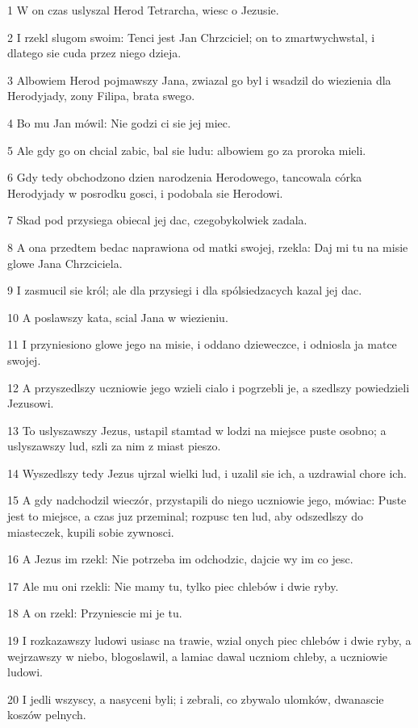 \par 1 W on czas uslyszal Herod Tetrarcha, wiesc o Jezusie.
\par 2 I rzekl slugom swoim: Tenci jest Jan Chrzciciel; on to zmartwychwstal, i dlatego sie cuda przez niego dzieja.
\par 3 Albowiem Herod pojmawszy Jana, zwiazal go byl i wsadzil do wiezienia dla Herodyjady, zony Filipa, brata swego.
\par 4 Bo mu Jan mówil: Nie godzi ci sie jej miec.
\par 5 Ale gdy go on chcial zabic, bal sie ludu: albowiem go za proroka mieli.
\par 6 Gdy tedy obchodzono dzien narodzenia Herodowego, tancowala córka Herodyjady w posrodku gosci, i podobala sie Herodowi.
\par 7 Skad pod przysiega obiecal jej dac, czegobykolwiek zadala.
\par 8 A ona przedtem bedac naprawiona od matki swojej, rzekla: Daj mi tu na misie glowe Jana Chrzciciela.
\par 9 I zasmucil sie król; ale dla przysiegi i dla spólsiedzacych kazal jej dac.
\par 10 A poslawszy kata, scial Jana w wiezieniu.
\par 11 I przyniesiono glowe jego na misie, i oddano dzieweczce, i odniosla ja matce swojej.
\par 12 A przyszedlszy uczniowie jego wzieli cialo i pogrzebli je, a szedlszy powiedzieli Jezusowi.
\par 13 To uslyszawszy Jezus, ustapil stamtad w lodzi na miejsce puste osobno; a uslyszawszy lud, szli za nim z miast pieszo.
\par 14 Wyszedlszy tedy Jezus ujrzal wielki lud, i uzalil sie ich, a uzdrawial chore ich.
\par 15 A gdy nadchodzil wieczór, przystapili do niego uczniowie jego, mówiac: Puste jest to miejsce, a czas juz przeminal; rozpusc ten lud, aby odszedlszy do miasteczek, kupili sobie zywnosci.
\par 16 A Jezus im rzekl: Nie potrzeba im odchodzic, dajcie wy im co jesc.
\par 17 Ale mu oni rzekli: Nie mamy tu, tylko piec chlebów i dwie ryby.
\par 18 A on rzekl: Przyniescie mi je tu.
\par 19 I rozkazawszy ludowi usiasc na trawie, wzial onych piec chlebów i dwie ryby, a wejrzawszy w niebo, blogoslawil, a lamiac dawal uczniom chleby, a uczniowie ludowi.
\par 20 I jedli wszyscy, a nasyceni byli; i zebrali, co zbywalo ulomków, dwanascie koszów pelnych.
